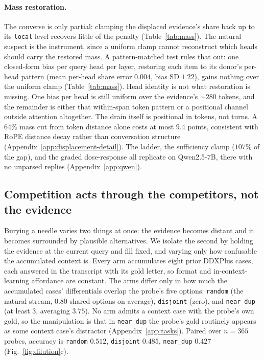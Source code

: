 \documentclass{article}
\begin{document}
\paragraph{Mass restoration.}
The converse is only partial: clamping the displaced evidence's share back up to its
\texttt{local} level recovers little of the penalty (Table~\ref{tab:mass}). The natural suspect is the instrument, since a uniform clamp cannot reconstruct which
heads should carry the restored mass. A pattern-matched test rules that out: one closed-form
bias per query head per layer, restoring each item to its donor's per-head pattern (mean
per-head share error $0.004$, bias SD $1.22$), gains nothing over the uniform clamp
(Table~\ref{tab:mass}).
Head identity is not what restoration is missing. One bias per head is still uniform over the
evidence's ${\sim}280$ tokens, and the remainder is either that within-span token pattern or a
positional channel outside attention altogether. The drain itself is positional in
tokens, not turns. A $64\%$ mass cut from token distance alone costs at most $9.4$
points, consistent with RoPE distance decay \citep{su2024rope,wu2025positionbias} rather than
conversation structure (Appendix~\ref{app:displacement-detail}). The ladder, the sufficiency
clamp ($107\%$ of the gap), and the graded dose-response all replicate on Qwen2.5-7B, there
with no unparsed replies (Appendix~\ref{app:qwen}).

\subsection{Competition acts through the competitors, not the evidence}
\label{sec:competition}

Burying a needle varies two things at once: the evidence becomes distant and it becomes
surrounded by plausible alternatives. We isolate the second by holding the evidence at the
current query and fill fixed, and varying only how confusable the accumulated context is.
Every arm accumulates eight prior DDXPlus cases, each answered in the transcript with its gold
letter, so format and in-context-learning affordance are constant. The arms differ only in how
much the accumulated cases' differentials overlap the probe's five options: \texttt{random}
(the natural stream, $0.80$ shared options on average), \texttt{disjoint} (zero), and
\texttt{near\_dup} (at least $3$, averaging $3.75$). No arm admits a context case with the
probe's own gold, so the manipulation is that in \texttt{near\_dup} the probe's gold routinely
appears as some context case's distractor (Appendix~\ref{app:tasks}). Paired
over $n{=}365$ probes, accuracy is \texttt{random} $0.512$, \texttt{disjoint} $0.485$,
\texttt{near\_dup} $\mathbf{0.427}$ (Fig.~\ref{fig:dilution}c).
\end{document}
